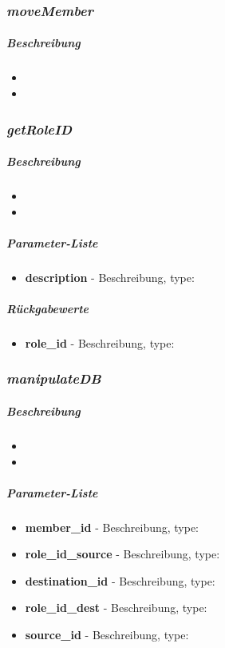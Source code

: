 \subsubsection*{\textit{moveMember}}\label{moveMemberMGUI}
\subparagraph{Beschreibung}
\begin{itemize}
	\item[] \noindent{} 
	\item[] 
\end{itemize}

\subsubsection*{\textit{getRoleID}}\label{getRoleIDMGUI}
\subparagraph{Beschreibung}
\begin{itemize}
	\item[] \noindent{} 
	\item[] 
\end{itemize}
\subparagraph{Parameter-Liste}
\begin{itemize}
	\item[] \textbf{description} - Beschreibung, type: 
\end{itemize}
\subparagraph{Rückgabewerte}
\begin{itemize}
	\item[] \textbf{role\_id} - Beschreibung, type:
\end{itemize}

\subsubsection*{\textit{manipulateDB}}\label{manipulateDBMGUI}
\subparagraph{Beschreibung}
\begin{itemize}
	\item[] \noindent{} 
	\item[] 
\end{itemize}
\subparagraph{Parameter-Liste}
\begin{itemize}
	\item[] \textbf{member\_id} - Beschreibung, type: 
	\item[] \textbf{role\_id\_source} - Beschreibung, type: 
	\item[] \textbf{destination\_id} - Beschreibung, type: 
	\item[] \textbf{role\_id\_dest} - Beschreibung, type: 
	\item[] \textbf{source\_id} - Beschreibung, type: 
\end{itemize}

